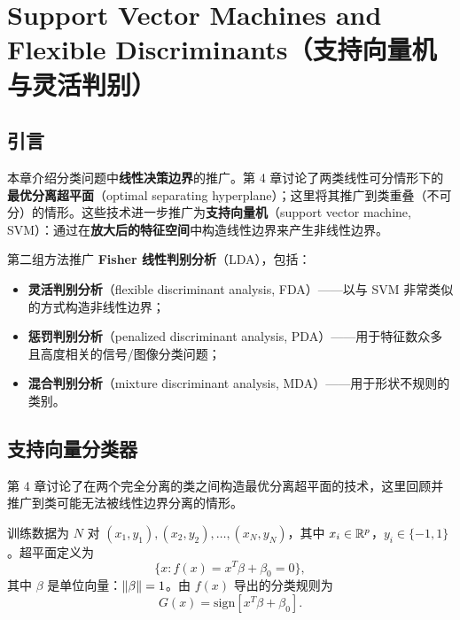 \chapter{Support Vector Machines and Flexible Discriminants（支持向量机与灵活判别）}

\section{引言}

本章介绍分类问题中\textbf{线性决策边界}的推广。第 4 章讨论了两类线性可分情形下的\textbf{最优分离超平面}（optimal separating hyperplane）；这里将其推广到类重叠（不可分）的情形。这些技术进一步推广为\textbf{支持向量机}（support vector machine, SVM）：通过在\textbf{放大后的特征空间}中构造线性边界来产生非线性边界。

第二组方法推广 \textbf{Fisher 线性判别分析}（LDA），包括：

\begin{itemize}
\item \textbf{灵活判别分析}（flexible discriminant analysis, FDA）——以与 SVM 非常类似的方式构造非线性边界；
\item \textbf{惩罚判别分析}（penalized discriminant analysis, PDA）——用于特征数众多且高度相关的信号/图像分类问题；
\item \textbf{混合判别分析}（mixture discriminant analysis, MDA）——用于形状不规则的类别。
\end{itemize}

\section{支持向量分类器}

第 4 章讨论了在两个完全分离的类之间构造最优分离超平面的技术，这里回顾并推广到类可能无法被线性边界分离的情形。

\begin{definition}[数据与超平面]
训练数据为 $N$ 对 $(x_1,y_1),(x_2,y_2),\dots,(x_N,y_N)$，其中 $x_i\in\mathbb{R}^p$，$y_i\in\{-1,1\}$。超平面定义为
\begin{equation}
\{x : f(x) = x^T\beta + \beta_0 = 0\}, \label{eq:12_1}
\end{equation}
其中 $\beta$ 是单位向量：$\left\lVert\beta\right\rVert=1$。由 $f(x)$ 导出的分类规则为
\begin{equation}
G(x) = \mathrm{sign}[x^T\beta + \beta_0]. \label{eq:12_2}
\end{equation}
\end{definition}

